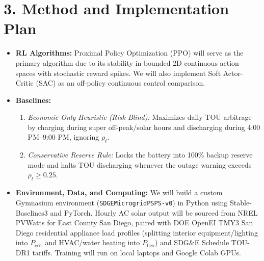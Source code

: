 \documentclass[11pt,letterpaper]{article}
\begin{document}
\section*{3. Method and Implementation Plan}
\begin{itemize}
  \item \textbf{RL Algorithms:} Proximal Policy Optimization (PPO) will serve as the primary algorithm due to its stability in bounded 2D continuous action spaces with stochastic reward spikes. We will also implement Soft Actor-Critic (SAC) as an off-policy continuous control comparison.
  \item \textbf{Baselines:}
  \begin{enumerate}
    \item \emph{Economic-Only Heuristic (Risk-Blind):} Maximizes daily TOU arbitrage by charging during super off-peak/solar hours and discharging during 4:00 PM--9:00 PM, ignoring $\rho_t$.
    \item \emph{Conservative Reserve Rule:} Locks the battery into 100\% backup reserve mode and halts TOU discharging whenever the outage warning exceeds $\rho_t \ge 0.25$.
  \end{enumerate}
  \item \textbf{Environment, Data, and Computing:} We will build a custom Gymnasium environment (\texttt{SDGEMicrogridPSPS-v0}) in Python using Stable-Baselines3 and PyTorch. Hourly AC solar output will be sourced from NREL PVWatts for East County San Diego, paired with DOE OpenEI TMY3 San Diego residential appliance load profiles (splitting interior equipment/lighting into $P_{\text{crit}}$ and HVAC/water heating into $P_{\text{flex}}$) and SDG\&E Schedule TOU-DR1 tariffs. Training will run on local laptops and Google Colab GPUs.
\end{itemize}
\end{document}
